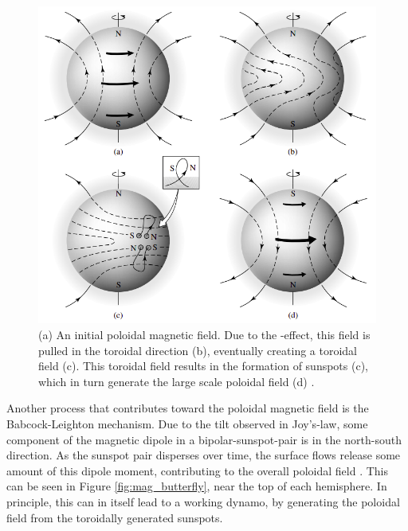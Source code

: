 \documentclass[11pt,a4paper,onecolumn]{report}
\begin{document}
\begin{figure}[t]
  \centering
  \includegraphics[width=0.6\linewidth]{dynamo.png}
  \caption{(a) An initial poloidal magnetic field. Due to the
  \textomega-effect, this field is pulled in the toroidal direction (b),
  eventually creating a toroidal field (c). This toroidal field results in the
  formation of sunspots (c), which in turn generate the large scale poloidal field
  (d) \citep{carroll2006}.}
  \label{fig:dynamo}
\end{figure}


Another process that contributes toward the poloidal magnetic field is the
Babcock-Leighton mechanism. Due to the tilt observed in Joy's-law, some
component of the magnetic dipole in a bipolar-sunspot-pair is in the north-south
direction. As the sunspot pair disperses over time, the surface flows release
some amount of this dipole moment, contributing to the overall poloidal field
\citep{babcock_topology_1961,leighton_transport_1964}. This can be seen in
Figure \ref{fig:mag_butterfly}, near the top of each hemisphere. In principle,
this can in itself lead to a working dynamo, by generating the poloidal field
from the toroidally generated sunspots. \\
\end{document}
